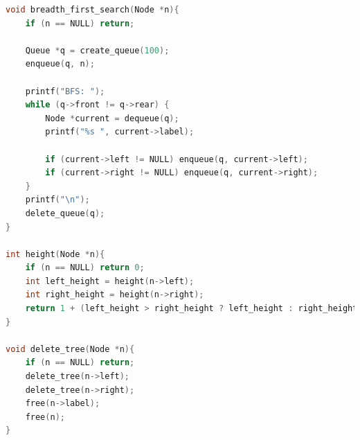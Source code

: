 \documentclass{ltjsarticle}
\begin{document}
\begin{lstlisting}[caption=binarytree.cの主要部, label=code:one, language=C, captionpos = b]
void breadth_first_search(Node *n){
    if (n == NULL) return;

    Queue *q = create_queue(100); 
    enqueue(q, n);

    printf("BFS: ");
    while (q->front != q->rear) { 
        Node *current = dequeue(q);
        printf("%s ", current->label);

        if (current->left != NULL) enqueue(q, current->left);
        if (current->right != NULL) enqueue(q, current->right);
    }
    printf("\n");
    delete_queue(q); 
}

int height(Node *n){
    if (n == NULL) return 0;
    int left_height = height(n->left);
    int right_height = height(n->right);
    return 1 + (left_height > right_height ? left_height : right_height);
}

void delete_tree(Node *n){
    if (n == NULL) return;
    delete_tree(n->left);
    delete_tree(n->right);
    free(n->label);
    free(n);
}
\end{lstlisting}
\end{document}
